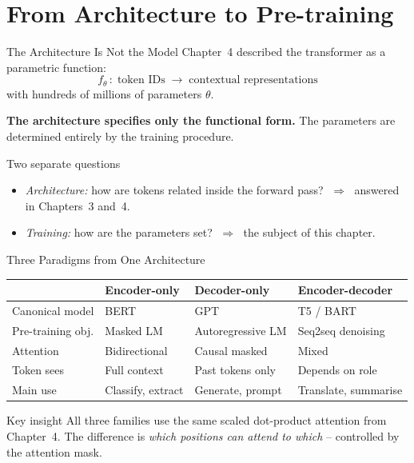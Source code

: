 \documentclass[11pt,aspectratio=169,professionalfonts]{beamer}
\begin{document}
\section{From Architecture to Pre-training}
%
\begin{frame}{The Architecture Is Not the Model}
  Chapter~4 described the transformer as a parametric function:
  \[
    f_{\theta}\,:\;\text{token IDs}\;\longrightarrow\;
    \text{contextual representations}
  \]
  with hundreds of millions of parameters $\theta$.
  \medskip

  \textbf{The architecture specifies only the functional form.}
  The parameters are determined entirely by the training procedure.

  \begin{block}{Two separate questions}
    \begin{itemize}
      \item \textit{Architecture:} how are tokens related inside the forward pass?
            $\;\Rightarrow\;$ answered in Chapters~3 and~4.
      \item \textit{Training:} how are the parameters set?
            $\;\Rightarrow\;$ the subject of this chapter.
    \end{itemize}
  \end{block}
\end{frame}
%
%
\begin{frame}{Three Paradigms from One Architecture}
  \begin{center}
  \scriptsize
  \renewcommand{\arraystretch}{1.25}
  \begin{tabular}{@{}llll@{}}
    \toprule
    & \textbf{Encoder-only} & \textbf{Decoder-only}
      & \textbf{Encoder-decoder}\\
    \midrule
    Canonical model & BERT & GPT & T5 / BART\\
    Pre-training obj. & Masked LM & Autoregressive LM & Seq2seq denoising\\
    Attention & Bidirectional & Causal masked & Mixed\\
    Token sees & Full context & Past tokens only & Depends on role\\
    Main use & Classify, extract & Generate, prompt & Translate, summarise\\
    \bottomrule
  \end{tabular}
  \end{center}

  \begin{block}{Key insight}
    All three families use the same scaled dot-product attention from Chapter~4.
    The difference is \emph{which positions can attend to which} --
    controlled by the attention mask.
  \end{block}
\end{frame}
\end{document}
